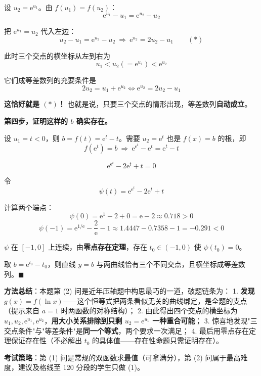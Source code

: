 \begin{answer}
设 $u_2=\mathrm e^{u_1}$。由 $f\left(u_1\right)=f\left(u_2\right)$：
\nopagebreak[4]
\[\mathrm e^{u_1}-u_1=\mathrm e^{u_2}-u_2\]

把 $\mathrm e^{u_1}=u_2$ 代入左边：
\nopagebreak[4]
\[u_2-u_1=\mathrm e^{u_2}-u_2\ \Longrightarrow\ \mathrm e^{u_2}=2u_2-u_1\qquad(\ast)\]

此时三个交点的横坐标从左到右为
\nopagebreak[4]
\[u_1<u_2\left(=\mathrm e^{u_1}\right)<\mathrm e^{u_2}\]

它们成等差数列的充要条件是
\nopagebreak[4]
\[2u_2=u_1+\mathrm e^{u_2}\iff \mathrm e^{u_2}=2u_2-u_1\]

\textbf{这恰好就是 $(\ast)$！} 也就是说，只要三个交点的情形出现，等差数列\textbf{自动成立}。

\textbf{第四步，证明这样的 $b$ 确实存在。}

设 $u_1=t<0$，则 $b=f(t)=\mathrm e^{t}-t$。需要 $u_2=\mathrm e^{t}$ 也是 $f(x)=b$ 的根，即
\nopagebreak[4]
\[f\left(\mathrm e^{t}\right)=b\ \Longrightarrow\ \mathrm e^{\mathrm e^{t}}-\mathrm e^{t}=\mathrm e^{t}-t\]

\nopagebreak[4]
\[\mathrm e^{\mathrm e^{t}}-2\mathrm e^{t}+t=0\]

令
\nopagebreak[4]
\[\psi(t)=\mathrm e^{\mathrm e^{t}}-2\mathrm e^{t}+t\]

计算两个端点：
\nopagebreak[4]
\[\psi(0)=\mathrm e^{1}-2+0=\mathrm e-2\approx0.718>0\]
\nopagebreak[4]
\[\psi(-1)=\mathrm e^{1/\mathrm e}-\frac2{\mathrm e}-1\approx1.4447-0.7358-1=-0.291<0\]

$\psi$ 在 $[-1,0]$ 上连续，由\textbf{零点存在定理}，存在 $t_0\in(-1,0)$ 使 $\psi\left(t_0\right)=0$。

取 $b=\mathrm e^{t_0}-t_0$，则直线 $y=b$ 与两曲线恰有三个不同交点，且横坐标成等差数列。$\blacksquare$

\begin{gktip}
\textbf{方法总结}：本题第 (2) 问是近年压轴题中构思最巧的一道，破题链条为：
1. \textbf{发现 $g(x)=f(\ln x)$}——这个恒等式把两条看似无关的曲线绑定，是全题的支点（提示来自 $a=1$ 时两函数的对称结构）；
2. 由此得出四个交点的横坐标为 $u_1,u_2,\mathrm e^{u_1},\mathrm e^{u_2}$，\textbf{用大小关系排除到只剩 $u_2=\mathrm e^{u_1}$ 一种重合可能}；
3. 惊喜地发现"三交点条件"与"等差条件"是\textbf{同一个等式}，两个要求一次满足；
4. 最后用零点存在定理保证存在性（不必解出 $t_0$ 的具体值——存在性命题只需证明存在）。

\textbf{考试策略}：第 (1) 问是常规的双函数求最值（可拿满分），第 (2) 问属于最高难度，建议及格线至 120 分段的学生只做 (1)。
\end{gktip}



\end{answer}